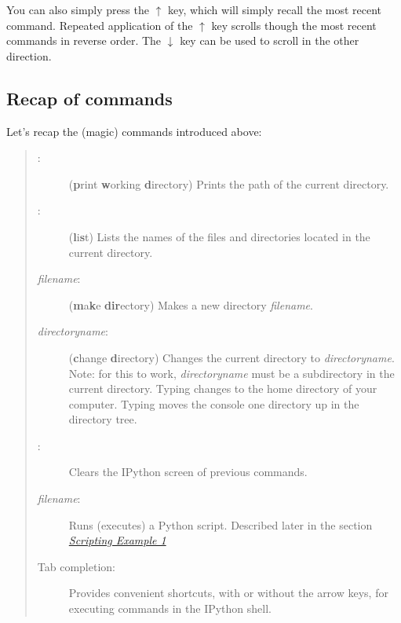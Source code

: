 \documentclass[letterpaper,10pt,english]{sphinxmanual}
\begin{document}
You can also simply press the \(\uparrow\) key, which will simply recall the most recent command.  Repeated application of the \(\uparrow\) key scrolls though the most recent commands in reverse order.  The \(\downarrow\) key can be used to scroll in the other direction.


\subsection{Recap of commands}
\label{chap2/chap2_basics:recap-of-commands}
Let's recap the (magic) commands introduced above:
\begin{quote}
\begin{description}
\item[{:}] \leavevmode
(\textbf{p}rint \textbf{w}orking \textbf{d}irectory) Prints the path of the current directory.

\item[{:}] \leavevmode
(\textbf{l}i\textbf{s}t)  Lists the names of the files and directories located in the current directory.

\item[{ \emph{filename}:}] \leavevmode
(\textbf{m}a\textbf{k}e \textbf{dir}ectory)  Makes a new directory \emph{filename}.

\item[{ \emph{directoryname}:}] \leavevmode
(\textbf{c}hange \textbf{d}irectory)  Changes the current directory to \emph{directoryname}.  Note: for this to work, \emph{directoryname} must be a subdirectory in the current directory.  Typing  changes to the home directory of your computer.  Typing  moves the console one directory up in the directory tree.

\item[{:}] \leavevmode
Clears the IPython screen of previous commands.

\item[{ \emph{filename}:}] \leavevmode
Runs (executes) a Python script.  Described later in the section {\hyperref[chap2/chap2_basics:chap2-scriptexmp1]{\emph{Scripting Example 1}}}

\item[{Tab completion:}] \leavevmode
Provides convenient shortcuts, with or without the arrow keys, for executing commands in the IPython shell.

\end{description}
\end{quote}
\end{document}
